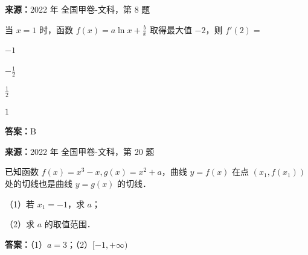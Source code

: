 \begin{question}[points=5]
\textbf{来源：}2022 年 全国甲卷-文科，第 8 题\par
当 $x=1$ 时，函数 $f(x)=a\ln x+\frac{b}{x}$ 取得最大值 $-2$，则 $f'(2)=$
\begin{choices}
  \item $-1$
  \item $-\frac{1}{2}$
  \item $\frac{1}{2}$
  \item $1$
\end{choices}
\begin{solution}
\textbf{答案：}B
\end{solution}
\end{question}

\begin{question}[points=12]
\textbf{来源：}2022 年 全国甲卷-文科，第 20 题\par
已知函数 $f(x)=x^3-x, g(x)=x^2+a$，曲线 $y=f(x)$ 在点 $(x_1, f(x_1))$ 处的切线也是曲线 $y=g(x)$ 的切线．

（1）若 $x_1=-1$，求 $a$；

（2）求 $a$ 的取值范围．
\begin{solution}
\textbf{答案：}（1）$a=3$；（2）$[-1,+\infty)$
\end{solution}
\end{question}

